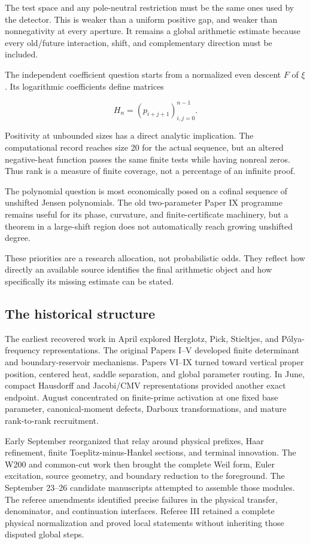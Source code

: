 \documentclass[
  10pt,
  a4paper,
  10pt,
  oneside,
  openany]{book}
\begin{document}
The test space and any pole-neutral restriction must be the same ones
used by the detector. This is weaker than a uniform positive gap, and
weaker than nonnegativity at every aperture. It remains a global
arithmetic estimate because every old/future interaction, shift, and
complementary direction must be included.

The independent coefficient question starts from a normalized even
descent \(F\) of \(\xi\). Its logarithmic coefficients define matrices

\[
H_n=(p_{i+j+1})_{i,j=0}^{n-1}.
\tag{1.2}\label{eq:1.2}
\]

Positivity at unbounded sizes has a direct analytic implication. The
computational record reaches size 20 for the actual sequence, but an
altered negative-heat function passes the same finite tests while having
nonreal zeros. Thus rank is a measure of finite coverage, not a
percentage of an infinite proof.

The polynomial question is most economically posed on a cofinal sequence
of unshifted Jensen polynomials. The old two-parameter Paper IX
programme remains useful for its phase, curvature, and
finite-certificate machinery, but a theorem in a large-shift region does
not automatically reach growing unshifted degree.

These priorities are a research allocation, not probabilistic odds. They
reflect how directly an available source identifies the final arithmetic
object and how specifically its missing estimate can be stated.

\subsection{The historical structure}\label{the-historical-structure}

The earliest recovered work in April explored Herglotz, Pick, Stieltjes,
and Pólya-frequency representations. The original Papers I--V developed
finite determinant and boundary-reservoir mechanisms. Papers VI--IX
turned toward vertical proper position, centered heat, saddle
separation, and global parameter routing. In June, compact Hausdorff and
Jacobi/CMV representations provided another exact endpoint. August
concentrated on finite-prime activation at one fixed base parameter,
canonical-moment defects, Darboux transformations, and mature
rank-to-rank recruitment.

Early September reorganized that relay around physical prefixes, Haar
refinement, finite Toeplitz-minus-Hankel sections, and terminal
innovation. The W200 and common-cut work then brought the complete Weil
form, Euler excitation, source geometry, and boundary reduction to the
foreground. The September 23--26 candidate manuscripts attempted to
assemble those modules. The referee amendments identified precise
failures in the physical transfer, denominator, and continuation
interfaces. Referee III retained a complete physical normalization and
proved local statements without inheriting those disputed global steps.
\end{document}
